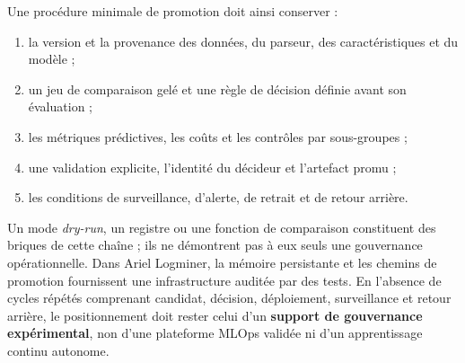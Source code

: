 Une procédure minimale de promotion doit ainsi conserver :
\begin{enumerate}
    \item la version et la provenance des données, du parseur, des caractéristiques et du modèle ;
    \item un jeu de comparaison gelé et une règle de décision définie avant son évaluation ;
    \item les métriques prédictives, les coûts et les contrôles par sous-groupes ;
    \item une validation explicite, l'identité du décideur et l'artefact promu ;
    \item les conditions de surveillance, d'alerte, de retrait et de retour arrière.
\end{enumerate}

Un mode \textit{dry-run}, un registre ou une fonction de comparaison constituent des
briques de cette chaîne ; ils ne démontrent pas à eux seuls une gouvernance opérationnelle.
Dans Ariel Logminer, la mémoire persistante et les chemins de promotion fournissent une
infrastructure auditée par des tests. En l'absence de cycles répétés comprenant candidat,
décision, déploiement, surveillance et retour arrière, le positionnement doit rester celui
d'un \textbf{support de gouvernance expérimental}, non d'une plateforme MLOps validée ni
d'un apprentissage continu autonome.

